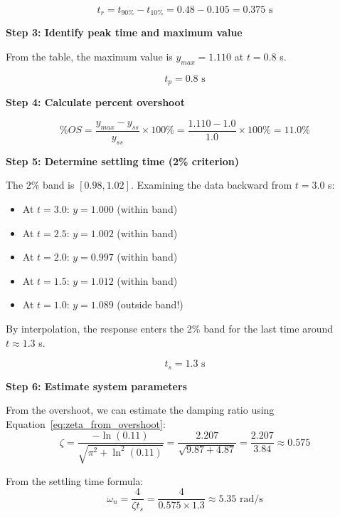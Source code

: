 \begin{equation}
    t_r = t_{90\%} - t_{10\%} = 0.48 - 0.105 = \boxed{0.375 \text{ s}}
\end{equation}

\textbf{Step 3: Identify peak time and maximum value}

From the table, the maximum value is $y_{max} = 1.110$ at $t = 0.8$ s.

\begin{equation}
    t_p = \boxed{0.8 \text{ s}}
\end{equation}

\textbf{Step 4: Calculate percent overshoot}

\begin{equation}
    \%OS = \frac{y_{max} - y_{ss}}{y_{ss}} \times 100\% = \frac{1.110 - 1.0}{1.0} \times 100\% = \boxed{11.0\%}
\end{equation}

\textbf{Step 5: Determine settling time (2\% criterion)}

The 2\% band is $[0.98, 1.02]$. Examining the data backward from $t = 3.0$ s:
\begin{itemize}
    \item At $t = 3.0$: $y = 1.000$ (within band)
    \item At $t = 2.5$: $y = 1.002$ (within band)
    \item At $t = 2.0$: $y = 0.997$ (within band)
    \item At $t = 1.5$: $y = 1.012$ (within band)
    \item At $t = 1.0$: $y = 1.089$ (outside band!)
\end{itemize}

By interpolation, the response enters the 2\% band for the last time around $t \approx 1.3$ s.

\begin{equation}
    t_s = \boxed{1.3 \text{ s}}
\end{equation}

\textbf{Step 6: Estimate system parameters}

From the overshoot, we can estimate the damping ratio using Equation~\eqref{eq:zeta_from_overshoot}:
\begin{equation}
    \zeta = \frac{-\ln(0.11)}{\sqrt{\pi^2 + \ln^2(0.11)}} = \frac{2.207}{\sqrt{9.87 + 4.87}} = \frac{2.207}{3.84} \approx 0.575
\end{equation}

From the settling time formula:
\begin{equation}
    \omega_n = \frac{4}{\zeta t_s} = \frac{4}{0.575 \times 1.3} \approx 5.35 \text{ rad/s}
\end{equation}

